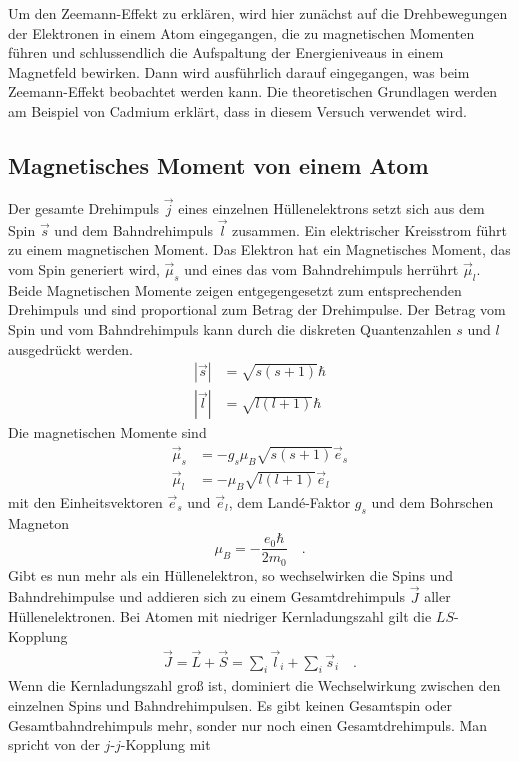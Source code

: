 Um den Zeemann-Effekt zu erklären, wird hier zunächst auf die Drehbewegungen der Elektronen in einem Atom eingegangen, die zu magnetischen Momenten führen und schlussendlich die Aufspaltung der Energieniveaus in einem Magnetfeld bewirken. Dann wird ausführlich darauf eingegangen, was beim Zeemann-Effekt beobachtet werden kann. Die theoretischen Grundlagen werden am Beispiel von Cadmium erklärt, dass in diesem Versuch verwendet wird.

\subsection{Magnetisches Moment von einem Atom}
Der gesamte Drehimpuls $\vec{j}$ eines einzelnen Hüllenelektrons setzt sich aus dem Spin $\vec{s}$ und dem Bahndrehimpuls $\vec{l}$ zusammen. Ein elektrischer Kreisstrom führt zu einem magnetischen Moment. Das Elektron hat ein Magnetisches Moment, das vom Spin generiert wird, $\vec{\mu}_s$ und eines das vom Bahndrehimpuls herrührt $\vec{\mu}_l$. Beide Magnetischen Momente zeigen entgegengesetzt zum entsprechenden Drehimpuls und sind proportional zum Betrag der Drehimpulse. Der Betrag vom Spin und vom Bahndrehimpuls kann durch die diskreten Quantenzahlen $s$ und $l$ ausgedrückt werden.
\begin{align}
	| \vec{s} | &= \sqrt{s(s+1)} \hbar \\
	| \vec{l} | &= \sqrt{l(l+1)} \hbar
\end{align}
Die magnetischen Momente sind 
\begin{align}
	\vec{\mu}_s &= - g_s \mu_B  \sqrt{s(s+1)} \vec{e}_s \\
	\vec{\mu}_l & = - \mu_B  \sqrt{l(l+1)} \vec{e}_l 
\end{align}
mit den Einheitsvektoren $\vec{e}_s$ und $\vec{e}_l$, dem Landé-Faktor $g_s$ und dem Bohrschen Magneton \\
\begin{equation}
	\mu_B =- \frac{e_0 \hbar}{2 m_0}  \quad .
\end{equation}
Gibt es nun mehr als ein Hüllenelektron, so wechselwirken die Spins und Bahndrehimpulse und addieren sich zu einem Gesamtdrehimpuls $\vec{J}$ aller Hüllenelektronen. Bei Atomen mit niedriger Kernladungszahl gilt die $LS$-Kopplung
\begin{align}
	\vec{J} = \vec{L} + \vec{S} = \sum_i \vec{l}_i + \sum_i \vec{s}_i \quad .
\end{align}
Wenn die Kernladungszahl groß ist, dominiert die Wechselwirkung zwischen den einzelnen Spins und Bahndrehimpulsen. Es gibt keinen Gesamtspin oder Gesamtbahndrehimpuls mehr, sonder nur noch einen Gesamtdrehimpuls. Man spricht von der $j$-$j$-Kopplung mit
